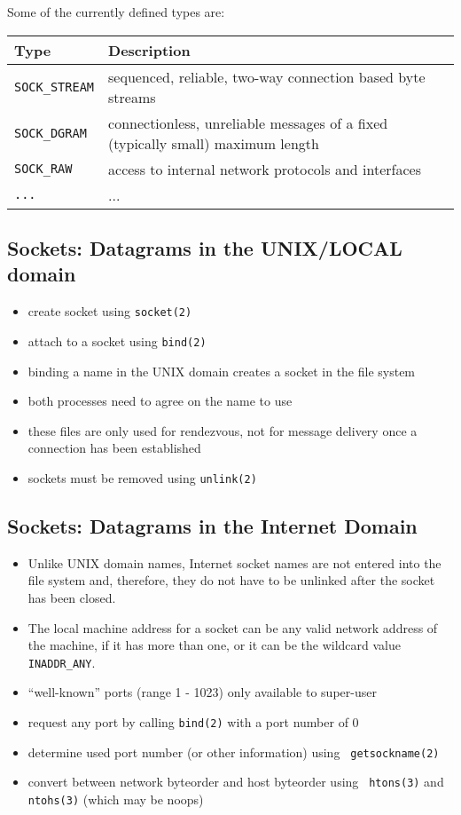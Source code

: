 \documentclass[xga]{xdvislides}
\begin{document}
Some of the currently defined types are:
\\

\small
\begin{tabular}{| l | l |}
	\hline
	{\bf Type}		&	{\bf Description} \\
	\hline
	{\tt SOCK\_STREAM}	&	sequenced, reliable, two-way connection based byte streams \\
	{\tt SOCK\_DGRAM}	&	connectionless, unreliable messages of a fixed (typically small)
							maximum length \\
	{\tt SOCK\_RAW}		&	access to internal network protocols and interfaces \\
	{\tt ...}		&	... \\
	\hline
\end{tabular}
\Normalsize

\subsection{Sockets: Datagrams in the UNIX/LOCAL domain}
\begin{itemize}
	\item create socket using {\tt socket(2)}
	\item attach to a socket using {\tt bind(2)}
	\item binding a name in the UNIX domain creates a socket in the file system
	\item both processes need to agree on the name to use
	\item these files are only used for rendezvous, not for message delivery
		once a connection has been established
	\item sockets must be removed using {\tt unlink(2)}
\end{itemize}

\subsection{Sockets: Datagrams in the Internet Domain}
\begin{itemize}
	\item Unlike UNIX domain names, Internet socket names are not entered into
		the file system and, therefore, they do not have to be unlinked after the
		socket has been closed.
	\item The local machine address for a socket can be any valid network address
		of the machine, if it has more than one, or it can be the wildcard value
		{\tt INADDR\_ANY}.
	\item ``well-known'' ports (range 1 - 1023) only available to super-user
	\item request any port by calling {\tt bind(2)} with a port number of 0
	\item determine used port number (or other information) using {\tt
		getsockname(2)}
	\item convert between network byteorder and host byteorder using {\tt
		htons(3)} and {\tt ntohs(3)} (which may be noops)
\end{itemize}
\end{document}
